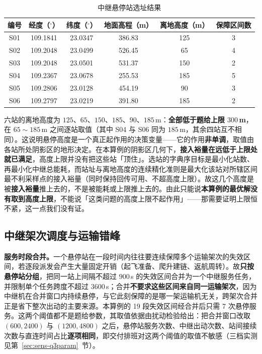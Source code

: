 \begin{table}[htbp]
	\caption{中继悬停站选址结果}
	\label{tab:q3-stations}
	\centering
	\small
	\begin{tabular}{cccccc}
		\toprule
		编号 & 经度（$^\circ$） & 纬度（$^\circ$） & 地面高程（m） & 离地高度（m） & 保障区间数 \\
		\midrule
		S01 & 109.1841 & 23.0347 & 386.83 & 125 & 3 \\
		S02 & 109.2048 & 23.0499 & 526.45 & 65 & 4 \\
		S03 & 109.2048 & 23.0501 & 531.37 & 150 & 2 \\
		S04 & 109.2367 & 23.0678 & 255.53 & 185 & 5 \\
		S05 & 109.2806 & 23.0128 & 454.19 & 90 & 3 \\
		S06 & 109.2797 & 23.0219 & 391.80 & 185 & 2 \\
		\bottomrule
	\end{tabular}
\end{table}

六站的离地高度为 $125$、$65$、$150$、$185$、$90$、$185$\,m：\textbf{全部低于题给上限 $300$\,m}，在 $65\sim185$\,m 之间逐站取值（其中 S04 与 S06 同为 $185$\,m，其余四站互不相同）。这说明悬停高度是一个真正起作用的决策变量——它的作用\textbf{非单调}，取值由各站所处阴影区的地形决定。在本算例的阴影区几何下，\textbf{接入裕量在远低于上限处就已满足}，高度上限并没有把这些站「顶住」。选站的字典序目标是最小化站数、再最小化中继总能耗，而站址与离地高度的连续精化准则是最大化该站对所辖区间最不利采样点的接入裕量（同时保持回传可用、不超高度上限）。故这几个高度是被\textbf{接入裕量}推上去的，不是被能耗或上限推上去的。由此只能说\textbf{本算例的最优解没有取到高度上限}，不能说「这类问题的高度上限不起作用」——那需要证明上限恒不紧，这一点我们没有证。

\subsection{中继架次调度与运输错峰}
\label{sec:q3-repair}

\textbf{服务时段合并。}一个悬停站在一段时间内往往要连续保障多个运输架次的失效区间，若逐段派发会产生大量固定开销（起飞准备、爬升建链、返航周转）。故\textbf{只按悬停站分组}，把同一站上间隔不超过 $900$\,s 的失效区间合并为一个中继服务任务，并限制单个任务跨度不超过 $3600$\,s；合并\textbf{不要求这些区间来自同一运输架次}，因为中继机在合并窗口内持续悬停，与它此刻保障的是哪一架运输机无关，跨架次合并正是省下整次出动的主要来源。本算例的 19 段失效区间经合并后只需 7 次悬停服务。这两个阈值都不是题给参数，其取值依据由扰动检验给出：把合并窗口改取 $(600,2400)$ 与 $(1200,4800)$ 之后，悬停站服务次数、中继出动次数、站间接续次数与直连时间占比\textbf{逐项相同}，即交付排班对这两个阈值的取值不敏感（三档实测见第~\ref{sec:sens-q3param}~节）。

